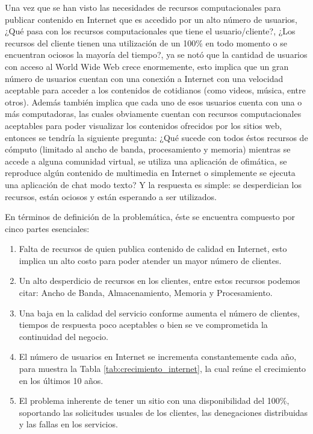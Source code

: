 Una vez que se han visto las necesidades de recursos computacionales para publicar contenido en Internet que es accedido por un alto número de usuarios, ¿Qué pasa con los recursos computacionales que tiene el usuario/cliente?, ¿Los recursos del cliente tienen una utilización de un 100\% en todo momento o se encuentran ociosos la mayoría del tiempo?, ya se notó que la cantidad de usuarios con acceso al World Wide Web crece enormemente, esto implica que un gran número de usuarios cuentan con una conexión a Internet con una velocidad aceptable para acceder a los contenidos de cotidianos (como videos, música, entre otros). Además también implica que cada uno de esos usuarios cuenta con una o más computadoras, las cuales obviamente cuentan con recursos computacionales aceptables para poder visualizar los contenidos ofrecidos por los sitios web, entonces se tendría la siguiente pregunta: ¿Qué sucede con todos éstos recursos de cómputo (limitado al ancho de banda, procesamiento y memoria) mientras se accede a alguna comunidad virtual, se utiliza una aplicación de ofimática, se reproduce algún contenido de multimedia en Internet o simplemente se ejecuta una aplicación de chat modo texto?  Y la respuesta es simple: se desperdician los recursos, están ociosos y están esperando a ser utilizados.

En términos de definición de la problemática, éste se encuentra compuesto por cinco partes esenciales:
\begin{enumerate}
\item Falta de recursos de quien publica contenido de calidad en Internet, esto implica un alto costo para poder atender un mayor número de clientes.
\item Un alto desperdicio de recursos en los clientes, entre estos recursos podemos citar: Ancho de Banda, Almacenamiento, Memoria y Procesamiento.
\item Una baja en la calidad del servicio conforme aumenta el número de clientes, tiempos de respuesta poco aceptables o bien se ve comprometida la continuidad del negocio. 
\item El número de usuarios en Internet se incrementa constantemente cada año, para muestra la Tabla \ref{tab:crecimiento_internet}, la cual reúne el crecimiento en los últimos 10 años.
\item El problema inherente de tener un sitio con una disponibilidad del 100\%, soportando las solicitudes usuales de los clientes, las denegaciones distribuidas y las fallas en los servicios. 
\end{enumerate}

